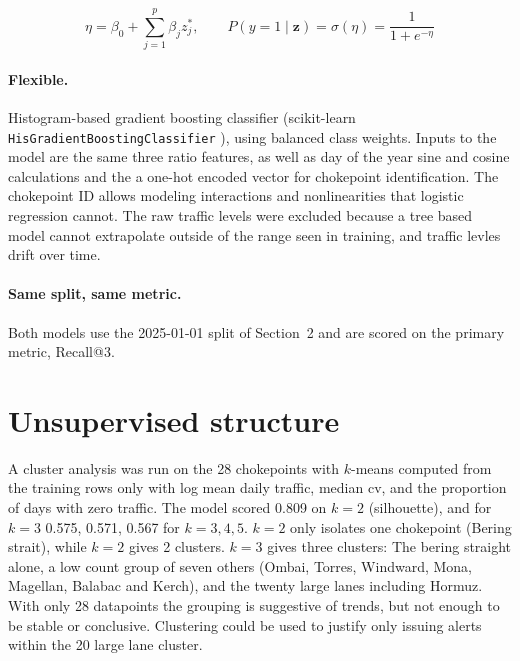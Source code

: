 \documentclass[11pt]{article}
\begin{document}
\[
    \eta = \beta_0 + \sum_{j=1}^{p} \beta_j z_j^*, \qquad
P(y = 1 \mid \mathbf{z}) = \sigma(\eta) = \frac{1}{1 + e^{-\eta}}
\]


\paragraph{Flexible.}

Histogram-based gradient boosting classifier (scikit-learn \texttt{HisGradientBoostingClassifier} \cite{sklearn}), using balanced class weights. Inputs to the model are the same three ratio features, as well as day of the year sine and cosine calculations and the a one-hot encoded vector for chokepoint identification. The chokepoint ID allows modeling interactions and nonlinearities that logistic regression cannot. The raw traffic levels were excluded because a tree based model cannot extrapolate outside of the range seen in training, and traffic levles drift over time. 

\paragraph{Same split, same metric.}
Both models use the 2025-01-01 split of Section~2 and are scored on the primary metric, Recall@3. 

\section{Unsupervised structure}  %
A cluster analysis was run on the 28 chokepoints with $k$-means computed from the training rows only with log mean daily traffic, median $\mathrm{cv}$, and the proportion of days with zero traffic. The model scored 0.809 on $k=2$ (silhouette), and for $k=3$ 0.575, 0.571, 0.567 for $k=3, 4, 5$. $k=2$ only isolates one chokepoint (Bering strait), while $k=2$ gives 2 clusters. $k=3$ gives three clusters: The bering straight alone, a low count group of seven others (Ombai, Torres, Windward, Mona, Magellan, Balabac and Kerch), and the twenty large lanes including Hormuz.  With only 28 datapoints the grouping is suggestive of trends, but not enough to be stable or conclusive. Clustering could be used to justify only issuing alerts within the 20 large lane cluster. 
\end{document}
